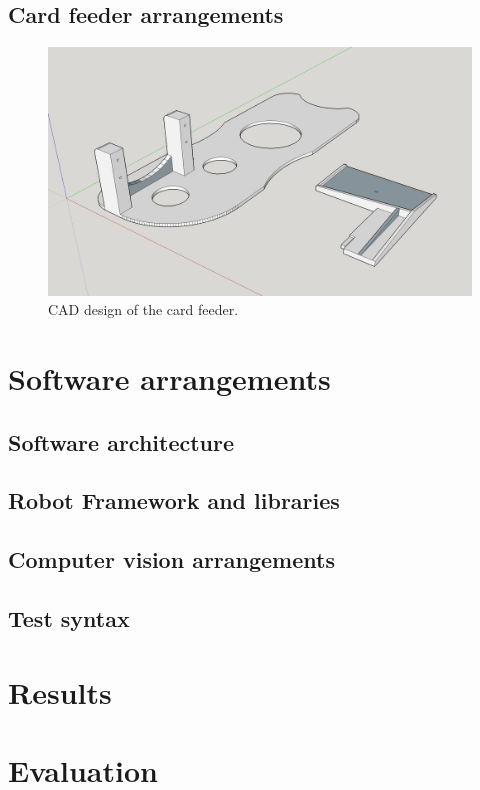 \subsection{Card feeder arrangements}
\label{subsection:Card feeder arrangements}

\begin{figure}[ht]
  \begin{center}
    \includegraphics[width=12cm]{images/card_feeder.png}
    \caption{CAD design of the card feeder.}
    \label{fig:pushing_tool}
  \end{center}
\end{figure}
\FloatBarrier

\section{Software arrangements}
\label{section:Software arrangements}

\subsection{Software architecture}
\label{subsection:Software architecture}

\subsection{Robot Framework and libraries}
\label{subsection:Robot Framework and libraries}

\subsection{Computer vision arrangements}
\label{subsection:Computer vision arrangements}

\subsection{Test syntax}
\label{subsection:Test syntax}


\section{Results}
\label{section:Results}

\section{Evaluation}
\label{section:Evaluation}